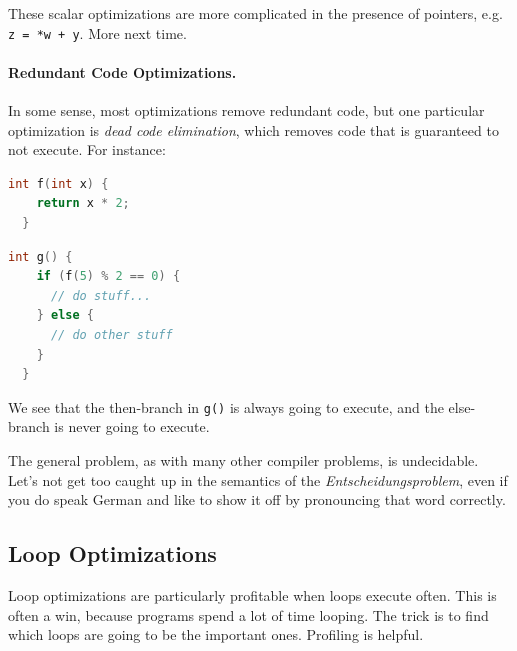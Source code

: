 \documentclass[a4paper]{report}
\begin{document}
These scalar optimizations are more complicated in the presence
of pointers, e.g. {\tt z = *w + y}. More next time.


\paragraph{Redundant Code Optimizations.} In some sense, most optimizations
remove redundant code, but one particular optimization is \emph{dead code
elimination}, which removes code that is guaranteed to not execute.
For instance:

{\scriptsize
\begin{center}
\vspace*{-2em}
\begin{minipage}{.3\textwidth}
\begin{lstlisting}[language=C]
  int f(int x) {
    return x * 2;
  }
  \end{lstlisting}
  \end{minipage} \begin{minipage}{.3\textwidth}
\begin{lstlisting}[language=C]
  int g() {
    if (f(5) % 2 == 0) {
      // do stuff...
    } else {
      // do other stuff
    }
  }
\end{lstlisting}
\end{minipage}
\end{center}
}
We see that the then-branch in {\tt g()} is always going to execute, and the
else-branch is never going to execute.

The general problem, as with many other compiler problems, is undecidable. Let's not get too caught up in the semantics of the \textit{Entscheidungsproblem}, even if you do speak German and like to show it off by pronouncing that word correctly.

\subsection*{Loop Optimizations}
Loop optimizations are particularly profitable when loops execute
often. This is often a win, because programs spend a lot of time looping.
The trick is to find which loops are going to be the important ones.
Profiling is helpful.
\end{document}
